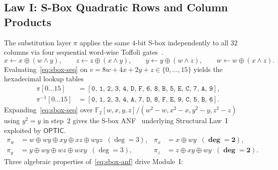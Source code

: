 \documentclass[11pt,a4paper]{article}
\theoremstyle{definition}
\theoremstyle{remark}
\newcommand{\Ftwo}{\mathbb{F}_2}
\newcommand{\OPTIC}{\mathsf{OPTIC}}
\begin{document}
\subsection{Law I: S-Box Quadratic Rows and Column Products}
The substitution layer $\pi$ applies the same $4$-bit S-box independently to all $32$ columns via four sequential word-wise Toffoli gates~\cite[Figure~3.1, p.~4]{GMW24}.
\begin{equation}
\label{eq:sbox-seq}
x \leftarrow x \oplus (w \wedge y), \qquad
z \leftarrow z \oplus (x \wedge y), \qquad
y \leftarrow y \oplus (w \wedge z), \qquad
w \leftarrow w \oplus (x \wedge z).
\end{equation}
Evaluating~\eqref{eq:sbox-seq} on $v = 8w + 4x + 2y + z \in \{0,\dots,15\}$ yields the hexadecimal lookup tables
\[
\begin{aligned}
\pi[0 \dots 15] &= [\texttt{0, 1, 2, 3, 4, D, F, 6, 8, B, 5, E, C, 7, A, 9}], \\
\pi^{-1}[0 \dots 15] &= [\texttt{0, 1, 2, 3, 4, A, 7, D, 8, F, E, 9, C, 5, B, 6}].
\end{aligned}
\]
Expanding~\eqref{eq:sbox-seq} over $\Ftwo[w,x,y,z]/(w^2{-}w, x^2{-}x, y^2{-}y, z^2{-}z)$ using $y^2 = y$ in step~2 gives the S-box ANF~\cite{BFG24,BRRT25,DG25} underlying Structural Law~I exploited by $\OPTIC$.
\begin{equation}
\label{eq:sbox-anf}
\begin{aligned}
\pi_w &= w \oplus wy \oplus xy \oplus xz \oplus wyz \;\;(\deg = 3), &
\pi_x &= x \oplus wy \;\;(\mathbf{\deg = 2}), \\
\pi_y &= y \oplus wy \oplus wz \oplus wxy \;\;(\deg = 3), &
\pi_z &= z \oplus xy \oplus wy \;\;(\mathbf{\deg = 2}).
\end{aligned}
\end{equation}
Three algebraic properties of~\eqref{eq:sbox-anf} drive Module~I:
\end{document}
